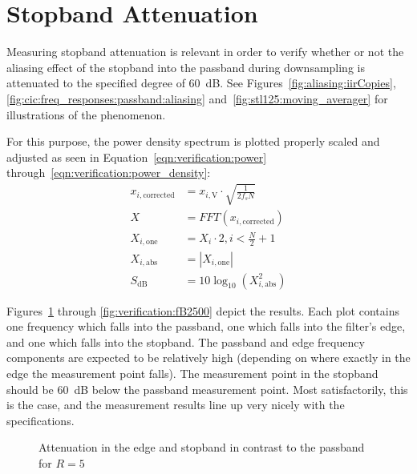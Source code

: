 \section{Stopband Attenuation} %
\label{sec:verification:snr}

Measuring stopband attenuation  is relevant in order to verify  whether or not
the aliasing effect  of the stopband into the passband  during downsampling is
attenuated to the specified degree of \SI{60}{\dB}. See
Figures~\ref{fig:aliasing:iirCopies},
\ref{fig:cic:freq_responses:passband:aliasing}
and~\ref{fig:stl125:moving_averager} for illustrations of the phenomenon.

For this purpose,  the power density spectrum is plotted
properly scaled and adjusted  as seen in Equation~\ref{eqn:verification:power}
through~\ref{eqn:verification:power_density}:
\begin{align}
    x_{i,\mathrm{corrected}} &= x_{i,\mathrm{V}} \cdot \sqrt{\frac{1}{2f_s N}} \label{eqn:verification:power} \\
    X                        &= FFT\left(x_{i,\mathrm{corrected}}\right)       \\
    X_{i,\mathrm{one}}       &= X_i \cdot 2, i < \frac{N}{2}+1                 \\
    X_{i,\mathrm{abs}}       &= |X_{i,\mathrm{one}}|                           \\
    S_{\si{\dB}}             &= 10\log_{10}(X_{i,\mathrm{abs}}^2)              \label{eqn:verification:power_density}
\end{align}

Figures~\ref{fig:verification:fB5}    through    \ref{fig:verification:fB2500}
depict  the results. Each  plot contains  one frequency  which falls  into the
passband, one which falls into the filter's edge, and one which falls into the
stopband.   The passband  and edge  frequency  components are  expected to  be
relatively high (depending on where exactly  in the edge the measurement point
falls). The measurement point in the stopband should be \SI{60}{\dB} below the
passband measurement  point. Most satisfactorily,  this is  the case,  and the
measurement results line up very nicely with the specifications.

\begin{figure}
    \centering
    
    \caption[Attenuation in the Edge and Stopband in Contrast to the Passband for R=5]{%
        Attenuation in the edge and stopband in contrast to the passband for $R=5$%
    }
    \label{fig:verification:fB5}
\end{figure}

